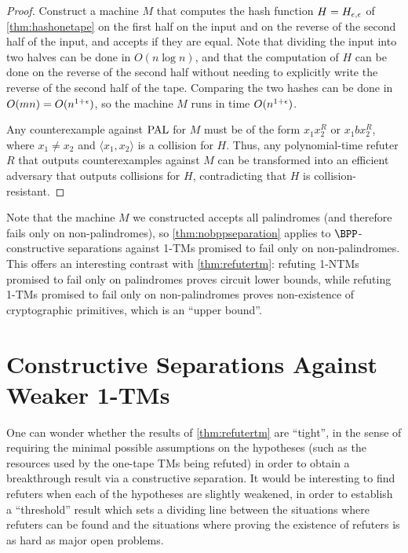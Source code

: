 \begin{proof}
Construct a machine $M$ that computes the hash function $H = H_{\epsilon, \epsilon}$ of \cref{thm:hashonetape} on the first
half on the input and on the reverse of the second half of the input, and accepts if they are equal. Note that dividing the 
input into two halves can be done in $O(n \log n)$, and that the computation of $H$ can be done on the reverse of
the second half without needing to explicitly write the reverse of the second half of the tape. Comparing the 
two hashes can be done in $O(mn) = O(n^{1+\epsilon})$, so the machine $M$ runs in time $O(n^{1+\epsilon})$. 

Any counterexample against $\mathrm{PAL}$ for $M$ must be of the form $x_1 x_2^R$ or $x_1 b x_2^R$,
where $x_1 \neq x_2$ and $\langle x_1, x_2 \rangle$ is a collision for $H$.
Thus, any polynomial-time refuter $R$ that outputs counterexamples against $M$ can be transformed into an 
efficient adversary that outputs collisions for $H$, contradicting that $H$ is collision-resistant. 
\end{proof}

Note that the machine $M$ we constructed accepts all palindromes (and therefore fails only on non-palindromes), so
\cref{thm:nobppseparation} applies to $\BPP$-constructive separations against 1-TMs promised to fail only on non-palindromes.
This offers an interesting contrast with \cref{thm:refutertm}: refuting 1-NTMs promised to fail only on palindromes proves
circuit lower bounds, while refuting 1-TMs promised to fail only on non-palindromes proves non-existence of cryptographic
primitives, which is an ``upper bound''.




\section{Constructive Separations Against Weaker 1-TMs}
\label{sec:refuteragainstweaker}

One can wonder whether the results of \cref{thm:refutertm} are ``tight'', in the sense of requiring the minimal possible assumptions
on the hypotheses (such as the resources used by the one-tape TMs being refuted) in order to obtain a breakthrough result via a constructive
separation. It would be interesting to find refuters when each of the hypotheses are slightly weakened, in order to establish a ``threshold''
result which sets a dividing line between the situations where refuters can be found and the situations where proving the existence of
refuters is as hard as major open problems.

